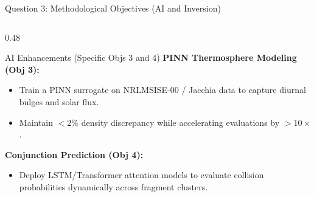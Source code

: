 \documentclass[aspectratio=169,10pt]{beamer}
\begin{document}
\begin{frame}{Question 3: Methodological Objectives (AI and Inversion)}
    \begin{columns}[t]
        \begin{column}{0.48\textwidth}
            \begin{block}{AI Enhancements (Specific Objs 3 and 4)}
                \small
                \textbf{PINN Thermosphere Modeling (Obj 3):}
                \begin{itemize}
                    \setlength{\itemsep}{2pt}
                    \item Train a PINN surrogate on NRLMSISE-00 / Jacchia data to capture diurnal bulges and solar flux.
                    \item Maintain $<2\%$ density discrepancy while accelerating evaluations by $>10\times$.
                \end{itemize}
                \vspace{0.12cm}
                \textbf{Conjunction Prediction (Obj 4):}
                \begin{itemize}
                    \setlength{\itemsep}{2pt}
                    \item Deploy LSTM/Transformer attention models to evaluate collision probabilities dynamically across fragment clusters.
                \end{itemize}
            \end{block}
        \end{column}


\end{columns}
\end{frame}
\end{document}
